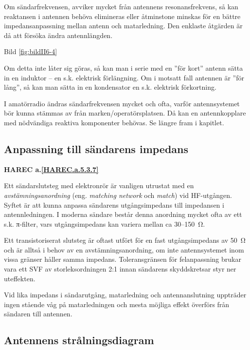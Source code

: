 Om sändarfrekvensen, avviker mycket från antennens resonansfrekvens,
så kan reaktansen i antennen behöva elimineras eller åtminstone
minskas för en bättre impedansanpassning mellan antenn och
matarledning. Den enklaste åtgärden är då att försöka ändra
antennlängden.

Bild \ref{fig:bildII6-4}

Om detta inte låter sig göras, så kan man i serie med en ''för kort''
antenn sätta in en induktor -- en s.k. elektrisk förlängning. Om i
motsatt fall antennen är ''för lång'', så kan man sätta in en
kondensator en s.k. elektrisk förkortning.

I amatörradio ändras sändarfrekvensen mycket och ofta, varför
antennsystemet bör kunna stämmas av från marken/operatörsplatsen. Då
kan en antennkopplare med nödvändiga reaktiva komponenter behövas.  Se
längre fram i kapitlet.

\subsection{Anpassning till sändarens impedans}
\textbf{
HAREC a.\ref{HAREC.a.5.3.7}\label{myHAREC.a.5.3.7}
}

Ett sändarslutsteg med elektronrör är vanligen utrustat med en
\emph{avstämningsanordning} (eng. \emph{matching network} och \emph{match})
vid HF-utgången. Syftet är att kunna anpassa
sändarens utgångsimpedans till impedansen i antennledningen. I moderna
sändare består denna anordning mycket ofta av ett s.k. π-filter, vars
utgångsimpedans kan variera mellan ca 30--150~Ω.

Ett transistoriserat slutsteg är oftast utfört för en fast
utgångsimpedans av 50~Ω och är alltså i behov av en
avstämningsanordning, om inte antennsystemet inom vissa gränser håller
samma impedans. Toleransgränsen för felanpassning brukar vara ett SVF
av storleksordningen 2:1 innan sändarens skyddskretsar styr ner
uteffekten.

Vid lika impedans i sändarutgång, matarledning och antennanslutning
uppträder ingen stående våg på matarledningen och mesta möjliga effekt
överförs från sändaren till antennen.

\subsection{Antennens strålningsdiagram}

